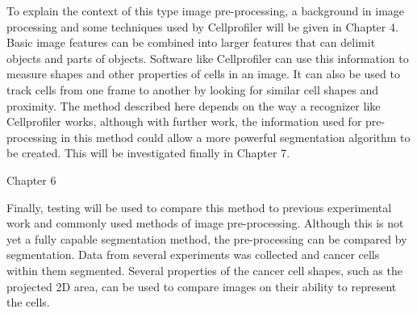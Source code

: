 To explain the context of this type image pre-processing, a background in image processing and some techniques used by Cellprofiler will be given in Chapter 4. Basic image features can be combined into larger features that can delimit objects and parts of objects. Software like Cellprofiler can use this information to measure shapes and other properties of cells in an image. It can also be used to track cells from one frame to another by looking for similar cell shapes and proximity. The method described here depends on the way a recognizer like Cellprofiler works, although with further work, the information used for pre-processing in this method could allow a more powerful segmentation algorithm to be created. This will be investigated finally in Chapter 7.

Chapter 6

Finally, testing will be used to compare this method to previous experimental work and commonly used methods of image pre-processing. Although this is not yet a fully capable segmentation method, the pre-processing can be compared by segmentation. Data from several experiments was collected and cancer cells within them segmented. Several properties of the cancer cell shapes, such as the projected 2D area, can be used to compare images on their ability to represent the cells.
